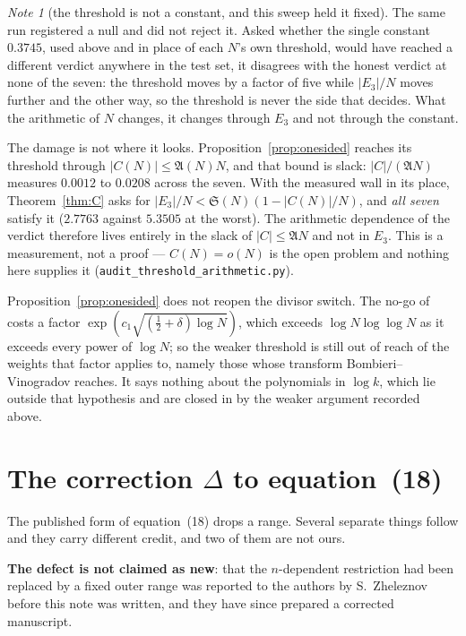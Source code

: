 \documentclass[11pt,a4paper]{article}
\theoremstyle{plain}
\theoremstyle{definition}
\theoremstyle{remark}
\newtheorem{note}[theorem]{Note}
\renewcommand{\SS}{\mathfrak{S}}
\newcommand{\AAA}{\mathfrak{A}}
\begin{document}
\begin{note}[the threshold is not a constant, and this sweep held it
fixed]
The same run registered a null and did not reject it. Asked whether the
single constant $0.3745$, used above and in place of each $N$'s own
threshold, would have reached a different verdict anywhere in the test
set, it disagrees with the honest verdict at none of the seven: the
threshold moves by a factor of five while $|E_3|/N$ moves further and
the other way, so the threshold is never the side that decides. What
the arithmetic of $N$ changes, it changes through $E_3$ and not through
the constant.

The damage is not where it looks. Proposition~\ref{prop:onesided}
reaches its threshold through $|C(N)|\le\AAA(N)N$, and that bound is
slack: $|C|/(\AAA N)$ measures $0.0012$ to $0.0208$ across the seven.
With the measured wall in its place, Theorem~\ref{thm:C} asks for
$|E_3|/N<\SS(N)(1-|C(N)|/N)$, and \emph{all seven} satisfy it
($2.7763$ against $5.3505$ at the worst). The arithmetic dependence of
the verdict therefore lives entirely in the slack of $|C|\le\AAA N$
and not in $E_3$. This is a measurement, not a proof --- $C(N)=o(N)$ is
the open problem and nothing here supplies it
(\texttt{audit\_threshold\_arithmetic.py}).
\end{note}

Proposition~\ref{prop:onesided} does not reopen the divisor switch.
The no-go of \cite{P2} costs a factor
$\exp(c_1\sqrt{(\tfrac12+\delta)\log N})$, which exceeds
$\log N\log\log N$ as
it exceeds every power of $\log N$; so the weaker threshold is still
out of reach of the weights that factor applies to, namely those
whose transform Bombieri--Vinogradov reaches. It says nothing about
the polynomials in $\log k$, which lie outside that hypothesis and
are closed in \cite{P2} by the weaker argument recorded above.

\section{The correction \texorpdfstring{$\Delta$}{Delta} to
equation~(18)}\label{sec:delta}

The published form of equation~(18) drops a range. Several separate
things follow and they carry different credit, and two of them are not
ours.

\textbf{The defect is not claimed as new}: that the $n$-dependent
restriction had been replaced by a fixed outer range was reported to
the authors by S.~Zheleznov before this note was written, and they have
since prepared a corrected manuscript.
\end{document}

